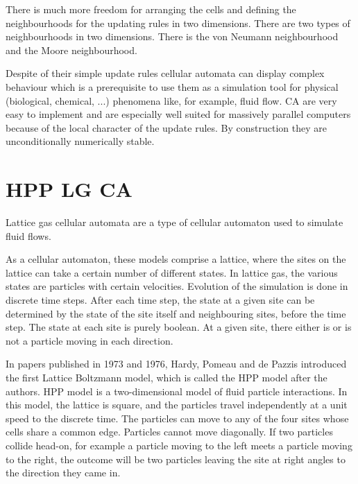 \documentclass[paper=a4, fontsize=11pt]{scrartcl} %
\numberwithin{equation}{section} %
\numberwithin{figure}{section} %
\numberwithin{table}{section} %
\begin{document}
There is much more freedom for arranging the cells and defining the neighbourhoods for the updating rules in two dimensions. There are two types of neighbourhoods in two dimensions. There is the von Neumann neighbourhood and the Moore neighbourhood.

Despite of their simple update rules cellular automata can display complex
behaviour which is a prerequisite to use them as a simulation tool for physical
(biological, chemical, ...) phenomena like, for example, fluid flow. CA are
very easy to implement and are especially well suited for massively parallel
computers because of the local character of the update rules. By construction
they are unconditionally numerically stable. \cite{LGCA}


\section{HPP LG CA}
Lattice gas cellular automata are a type of cellular automaton used to simulate fluid flows.

As a cellular automaton, these models comprise a lattice, where the sites on the lattice can take a certain number of different states. In lattice gas, the various states are particles with certain velocities. Evolution of the simulation is done in discrete time steps. After each time step, the state at a given site can be determined by the state of the site itself and neighbouring sites, before the time step.
The state at each site is purely boolean. At a given site, there either is or is not a particle moving in each direction.

In papers published in 1973 and 1976, Hardy, Pomeau and de Pazzis introduced the first Lattice Boltzmann model, which is called the HPP model after the authors. HPP model is a two-dimensional model of fluid particle interactions. In this model, the lattice is square, and the particles travel independently at a unit speed to the discrete time. The particles can move to any of the four sites whose cells share a common edge. Particles cannot move diagonally.
If two particles collide head-on, for example a particle moving to the left meets a particle moving to the right, the outcome will be two particles leaving the site at right angles to the direction they came in. \cite{wiki-lg}
\end{document}
